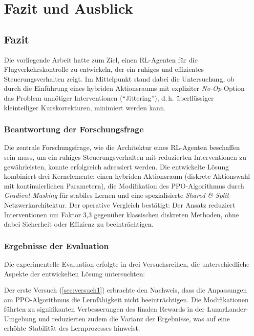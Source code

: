 \chapter{Fazit und Ausblick}
\label{ch:zusammenfassung}
\section{Fazit}
Die vorliegende Arbeit hatte zum Ziel, einen \ac{RL}-Agenten für die Flugverkehrskontrolle zu entwickeln, der ein ruhiges und effizientes Steuerungsverhalten zeigt. Im Mittelpunkt stand dabei die Untersuchung, ob durch die Einführung eines hybriden Aktionsraums mit expliziter \emph{No-Op}-Option das Problem unnötiger Interventionen (\enquote{Jittering}), d.\,h. überflüssiger kleinteiliger Kurskorrekturen, minimiert werden kann.

\subsection*{Beantwortung der Forschungsfrage}
Die zentrale Forschungsfrage, wie die Architektur eines \ac{RL}-Agenten beschaffen sein muss, um ein ruhiges Steuerungsverhalten mit reduzierten Interventionen zu gewährleisten, konnte erfolgreich adressiert werden. Die entwickelte Lösung kombiniert drei Kernelemente: einen hybriden Aktionsraum (diskrete Aktionswahl mit kontinuierlichen Parametern), die Modifikation des \ac{PPO}-Algorithmus durch \emph{Gradient\hyp{}Masking} für stabiles Lernen und eine spezialisierte \emph{Shared \& Split}-Netzwerkarchitektur. Der operative Vergleich bestätigt: Der Ansatz reduziert Interventionen um Faktor 3,3 gegenüber klassischen diskreten Methoden, ohne dabei Sicherheit oder Effizienz zu beeinträchtigen.

\subsection*{Ergebnisse der Evaluation}
Die experimentelle Evaluation erfolgte in drei Versuchsreihen, die unterschiedliche Aspekte der entwickelten Lösung untersuchten:
\medskip

Der erste Versuch (\ref{sec:versuch1}) erbrachte den Nachweis, dass die Anpassungen am \ac{PPO}-Algorithmus die Lernfähigkeit nicht beeinträchtigen. Die Modifikationen führten zu signifikanten Verbesserungen des finalen Rewards in der LunarLander-Umgebung und reduzierten zudem die Varianz der Ergebnisse, was auf eine erhöhte Stabilität des Lernprozesses hinweist.
\medskip

